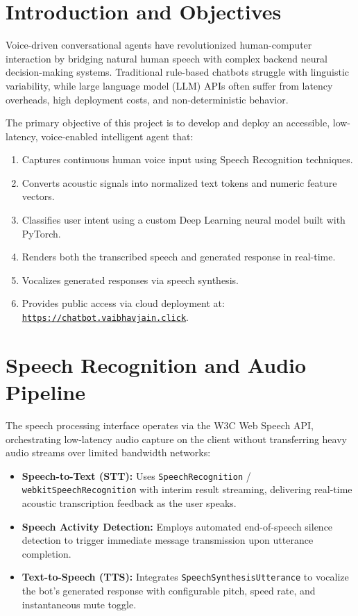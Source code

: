 \documentclass[11pt,a4paper]{article}
\begin{document}
\section{Introduction and Objectives}
Voice-driven conversational agents have revolutionized human-computer interaction by bridging natural human speech with complex backend neural decision-making systems. Traditional rule-based chatbots struggle with linguistic variability, while large language model (LLM) APIs often suffer from latency overheads, high deployment costs, and non-deterministic behavior.

The primary objective of this project is to develop and deploy an accessible, low-latency, voice-enabled intelligent agent that:
\begin{enumerate}[noitemsep]
    \item Captures continuous human voice input using Speech Recognition techniques.
    \item Converts acoustic signals into normalized text tokens and numeric feature vectors.
    \item Classifies user intent using a custom Deep Learning neural model built with PyTorch.
    \item Renders both the transcribed speech and generated response in real-time.
    \item Vocalizes generated responses via speech synthesis.
    \item Provides public access via cloud deployment at: \href{https://chatbot.vaibhavjain.click}{\texttt{https://chatbot.vaibhavjain.click}}.
\end{enumerate}

\section{Speech Recognition and Audio Pipeline}
The speech processing interface operates via the W3C Web Speech API, orchestrating low-latency audio capture on the client without transferring heavy audio streams over limited bandwidth networks:
\begin{itemize}[noitemsep]
    \item \textbf{Speech-to-Text (STT):} Uses \texttt{SpeechRecognition} / \texttt{webkitSpeechRecognition} with interim result streaming, delivering real-time acoustic transcription feedback as the user speaks.
    \item \textbf{Speech Activity Detection:} Employs automated end-of-speech silence detection to trigger immediate message transmission upon utterance completion.
    \item \textbf{Text-to-Speech (TTS):} Integrates \texttt{SpeechSynthesisUtterance} to vocalize the bot's generated response with configurable pitch, speed rate, and instantaneous mute toggle.
\end{itemize}
\end{document}
